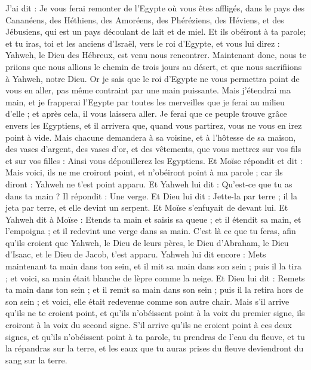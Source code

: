 \begin{multicols}{2}
J'ai dit : Je vous ferai remonter de l'Egypte où vous êtes affligés, dans le pays des Cananéens, des Héthiens, des Amoréens, des Phéréziens, des Héviens, et des Jébusiens, qui est un pays découlant de lait et de miel.
Et ils obéiront à ta parole; et tu iras, toi et les anciens d'Israël, vers le roi d'Egypte, et vous lui direz : Yahweh, le Dieu des Hébreux, est venu nous rencontrer. Maintenant donc, nous te priions que nous allions le chemin de trois jours au désert, et que nous sacrifiions à Yahweh, notre Dieu.
Or je sais que le roi d'Egypte ne vous permettra point de vous en aller, pas même contraint par une main puissante.
Mais j'étendrai ma main, et je frapperai l'Egypte par toutes les merveilles que je ferai au milieu d'elle ; et après cela, il vous laissera aller.
Je ferai que ce peuple trouve grâce envers les Egyptiens, et il arrivera que, quand vous partirez, vous ne vous en irez point à vide.
Mais chacune demandera à sa voisine, et à l'hôtesse de sa maison, des vases d'argent, des vases d'or, et des vêtements, que vous mettrez sur vos fils et sur vos filles : Ainsi vous dépouillerez les Egyptiens.
\VerseOne{}Et Moïse répondit et dit : Mais voici, ils ne me croiront point, et n'obéiront point à ma parole ; car ils diront : Yahweh ne t'est point apparu.
Et Yahweh lui dit : Qu'est-ce que tu as dans ta main ? Il répondit : Une verge.
Et Dieu lui dit : Jette-la par terre ; il la jeta par terre, et elle devint un serpent. Et Moïse s'enfuyait de devant lui.
Et Yahweh dit à Moïse : Etends ta main et saisis sa queue ; et il étendit sa main, et l'empoigna ; et il redevint une verge dans sa main.
C’est là ce que tu feras, afin qu'ils croient que Yahweh, le Dieu de leurs pères, le Dieu d'Abraham, le Dieu d'Isaac, et le Dieu de Jacob, t'est apparu.
Yahweh lui dit encore : Mets maintenant ta main dans ton sein, et il mit sa main dans son sein ; puis il la tira ; et voici, sa main était blanche de lèpre comme la neige.
Et Dieu lui dit : Remets ta main dans ton sein ; et il remit sa main dans son sein ; puis il la retira hors de son sein ; et voici, elle était redevenue comme son autre chair.
Mais s'il arrive qu'ils ne te croient point, et qu'ils n'obéissent point à la voix du premier signe, ils croiront à la voix du second signe.
S'il arrive qu'ils ne croient point à ces deux signes, et qu'ils n'obéissent point à ta parole, tu prendras de l'eau du fleuve, et tu la répandras sur la terre, et les eaux que tu auras prises du fleuve deviendront du sang sur la terre.

\end{multicols}
